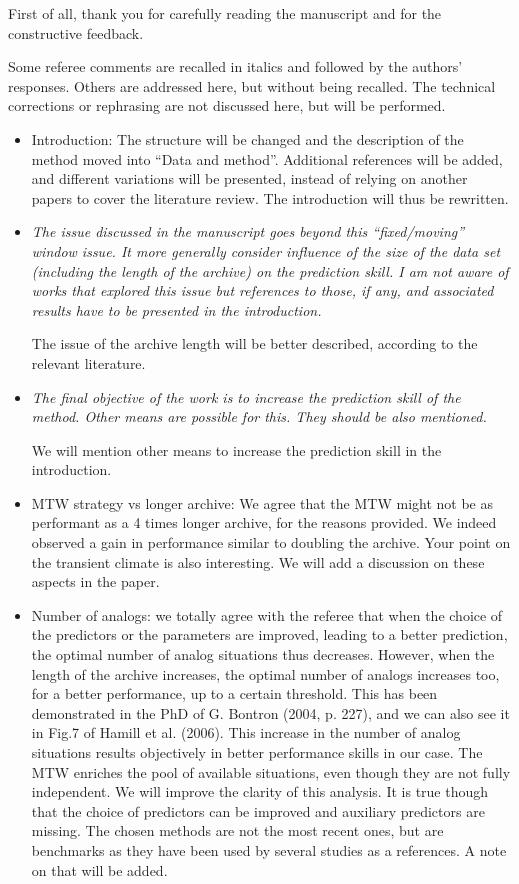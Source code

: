 \documentclass[]{letter}
\begin{document}
First of all, thank you for carefully reading the manuscript and for the constructive feedback.

Some referee comments are recalled in italics and followed by the authors’ responses. Others are addressed here, but without being recalled. The technical corrections or rephrasing are not discussed here, but will be performed.

\begin{itemize}
	\item Introduction: The structure will be changed and the description of the method moved into “Data and method”. Additional references will be added, and different variations will be presented, instead of relying on another papers to cover the literature review. The introduction will thus be rewritten.
	
	\item \textit{The issue discussed in the manuscript goes beyond this “fixed/moving” window issue. It more generally consider influence of the size of the data set (including the length of the archive) on the prediction skill. I am not aware of works that explored this issue but references to those, if any, and associated results have to be presented in the introduction.}
	
	The issue of the archive length will be better described, according to the relevant literature.
	
	\item \textit{The final objective of the work is to increase the prediction skill of the method. Other means are possible for this. They should be also mentioned.}
	
	We will mention other means to increase the prediction skill in the introduction.
	
	\item MTW strategy vs longer archive: We agree that the MTW might not be as performant as a 4 times longer archive, for the reasons provided. We indeed observed a gain in performance similar to doubling the archive. Your point on the transient climate is also interesting. We will add a discussion on these aspects in the paper. 
	
	\item Number of analogs: we totally agree with the referee that when the choice of the predictors or the parameters are improved, leading to a better prediction, the optimal number of analog situations thus decreases. However, when the length of the archive increases, the optimal number of analogs increases too, for a better performance, up to a certain threshold. This has been demonstrated in the PhD of G. Bontron (2004, p. 227), and we can also see it in Fig.7 of Hamill et al. (2006). This increase in the number of analog situations results objectively in better performance skills in our case. The MTW enriches the pool of available situations, even though they are not fully independent. We will improve the clarity of this analysis. It is true though that the choice of predictors can be improved and auxiliary predictors are missing. The chosen methods are not the most recent ones, but are benchmarks as they have been used by several studies as a references. A note on that will be added.
	

\end{itemize}
\end{document}
